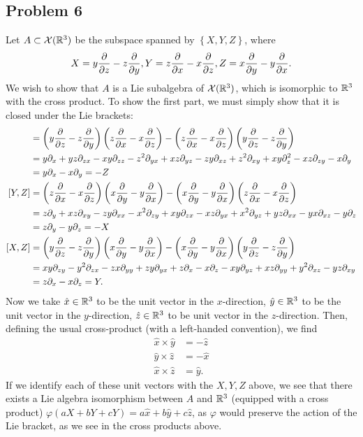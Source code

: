 \documentclass{../../mathnotes}
\begin{document}
\subsection*{Problem 6}

Let $A\subset\mathcal{X}(\mathbb{R}^3)$ be the subspace spanned by $\left\{ X,Y,Z \right\}$, where
\begin{align*}
    X=y\frac{\partial}{\partial z}-z\frac{\partial}{\partial y}, Y=z\frac{\partial}{\partial x}-x\frac{\partial}{\partial z}, Z=x\frac{\partial}{\partial y}-y\frac{\partial}{\partial x}.
\end{align*}
We wish to show that $A$ is a Lie subalgebra of $\mathcal{X}(\mathbb{R}^3)$, which is isomorphic to $\mathbb{R}^3$ with the
cross product. To show the first part, we must simply show that it is closed under the Lie brackets:
\begin{align*}
    [X,Y]&=\left( y\frac{\p}{\p z}-z\frac{\p}{\p y} \right)\left( z\frac{\p}{\p x}-x\frac{\p}{\p z} \right)
    -\left( z\frac{\p}{\p x}-x\frac{\p}{\p z} \right)\left( y\frac{\p}{\p z}-z\frac{\p}{\p y} \right)\\
    &=y\p_x+yz\p_{zx}-xy\p_{zz}-z^2\p_{yx}+xz\p_{yz}
    -zy\p_{xz}+z^2\p_{xy}+xy\p_z^2-xz\p_{zy}-x\p_y\\
    &=y\p_x-x\p_y=-Z\\
    [Y,Z]&=\left( z\frac{\p}{\p x}-x\frac{\p}{\p z} \right)\left( x\frac{\p}{\p y}-y\frac{\p}{\p x} \right)
    -\left( x\frac{\p}{\p y}-y\frac{\p}{\p x} \right)\left( z\frac{\p}{\p x}-x\frac{\p}{\p z} \right)\\
    &=z\p_y+xz\p_{xy}-zy\p_{xx}-x^2\p_{zy}+xy\p_{zx}-xz\p_{yx}+x^2\p_{yz}+yz\p_{xx}-yx\p_{xz}-y\p_z\\
    &=z\p_y-y\p_z=-X\\
    [X,Z]&=\left( y\frac{\p}{\p z}-z\frac{\p}{\p y} \right)\left( x\frac{\p}{\p y}-y\frac{\p}{\p x} \right)
    -\left( x\frac{\p}{\p y}-y\frac{\p}{\p x} \right)\left( y\frac{\p}{\p z}-z\frac{\p}{\p y} \right)\\
    &=xy\p_{zy}-y^2\p_{zx}-zx\p_{yy}+zy\p_{yx}+z\p_x-x\p_z-xy\p_{yz}+xz\p_{yy}+y^2\p_{xz}-yz\p_{xy}\\
    &=z\p_x-x\p_z=Y.
\end{align*}
Now we take $\hat x\in\mathbb{R}^3$ to be the unit vector in the $x$-direction, $\hat y\in\mathbb{R}^3$ to be the unit
vector in the $y$-direction, $\hat z\in\mathbb{R}^3$ to be unit vector in the $z$-direction. Then, defining the usual
cross-product (with a left-handed convention), we find 
\begin{align*}
    \hat x \times \hat y &= -\hat z\\
    \hat y \times \hat z &= -\hat x\\
    \hat x \times \hat z &= \hat y.
\end{align*}
If we identify each of these unit vectors with the $X,Y,Z$ above, we see that there exists a Lie algebra
isomorphism between $A$ and $\mathbb{R}^3$ (equipped with a cross product) $\varphi(aX+bY+cY)=a\hat x+b\hat y+c\hat z$,
as $\varphi$ would preserve the action of the Lie bracket, as we see in the cross products above.
\end{document}

